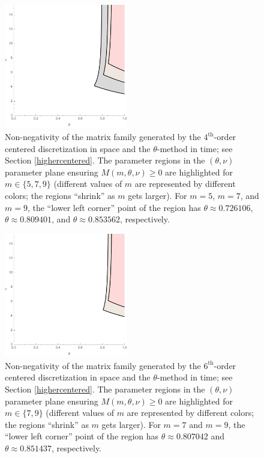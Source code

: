 \documentclass[smallextended,numbook,runningheads]{svjour3}     %
\newcommand{\te}{\theta}
\begin{document}
\begin{figure}
\begin{center}
\includegraphics[width=0.48\textwidth]{fig_5stencilm579.pdf}
\caption{Non-negativity of the matrix family generated by the $4^\text{th}$-order centered discretization in space and the $\theta$-method in time; see Section \ref{highercentered}. The parameter regions in the $(\te,\nu)$ parameter plane ensuring $M(m,\te,\nu)\ge 0$ are highlighted for $m\in\{5, 7, 9\}$ (different values of $m$ are represented by different colors; the regions ``shrink'' as $m$ gets larger). For $m=5$, $m=7$, and $m=9$, the ``lower left corner'' point of the region has $\theta\approx 0.726106$, $\theta\approx 0.809401$, and $\theta\approx 0.853562$, respectively.}\label{fig_5stencilm579}
\end{center}
\end{figure}

\begin{figure}
\begin{center}
\includegraphics[width=0.48\textwidth]{fig_7stencilm79.pdf}
\caption{Non-negativity of the matrix family generated by the $6^\text{th}$-order centered discretization in space and the $\theta$-method in time; see Section \ref{highercentered}. The parameter regions in the $(\te,\nu)$ parameter plane ensuring $M(m,\te,\nu)\ge 0$ are highlighted for $m\in\{7, 9\}$ (different values of $m$ are represented by different colors; the regions ``shrink'' as $m$ gets larger). For $m=7$ and $m=9$, the ``lower left corner'' point of the region has $\theta\approx 0.807042$ and $\theta\approx 0.851437$, respectively.}\label{fig_7stencilm79}
\end{center}
\end{figure}
\end{document}
